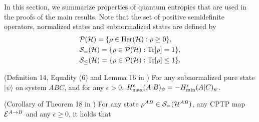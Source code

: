 \documentclass[journal]{IEEEtran}
\newcommand{\tr}{\mathrm{Tr}}
\begin{document}
In this section, we summarize properties of quantum entropies that are used in the proofs of the main results.
Note that the set of positive semidefinite operators, normalized states and subnormalized states are defined by
\begin{align}
&
\ca{P}(\ca{H}) = \{\rho \in {\rm Her}(\ca{H}) : \rho \geq 0 \},
\\
&
\ca{S}_=(\ca{H}) = \{\rho \in \ca{P}(\ca{H}) : \tr [\rho]=1 \},
\\
&
\ca{S}_{\leq}(\ca{H}) = \{\rho \in \ca{P}(\ca{H}) : \tr [\rho] \leq 1 \}.
\end{align}


\begin{lmm}
\label{lmm:duality}
(Definition 14, Equality (6) and Lemma 16 in \cite{tomamichel2010duality})
For any subnormalized pure state $|\psi\rangle$ on system $ABC$, and for any $\epsilon>0$, 
$H_{\rm max}^\epsilon(A|B)_\psi=
-
H_{\rm min}^\epsilon(A|C)_\psi$.
\end{lmm}

(Corollary of Theorem 18 in  \cite{tomamichel2010duality})
For any state $\rho^{AB}\in{\mathcal S}_=({\mathcal H}^{AB})$, any CPTP map ${\mathcal E}^{A\rightarrow B}$ and any $\epsilon\geq0$, it holds that
\elmm
\end{document}
